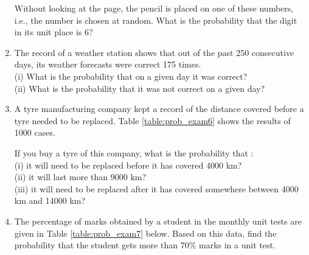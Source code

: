 \begin{enumerate}[label=\arabic*.,ref=\thesubsection.\theenumi]
\begin{table}[!ht]
\centering
{}
\caption{}
\label{table:prob_exam4}
\end{table}
Without looking at the page, the pencil is placed on one of these numbers, i.e., the number is chosen at random. What is the probability that the digit in its unit place is 6?\\
\solution

   \item The record of a weather station shows that out of the past 250 consecutive days, its weather forecasts were correct 175 times.\\
   (i) What is the probability that on a given day it was correct?\\
(ii) What is the probability that it was not correct on a given day?\\
\solution

\item A tyre manufacturing company kept a record of the distance covered
before a tyre needed to be replaced. Table \ref{table:prob_exam6}
shows the results of 1000 cases.
\begin{table}[!ht]
\centering
{}
\caption{}
\label{table:prob_exam6}
\end{table}
If you buy a tyre of this company, what is the probability that :\\
(i) it will need to be replaced before it has covered 4000 km?\\
(ii) it will last more than 9000 km?\\
(iii) it will need to be replaced after it has covered somewhere between 4000 km and 14000 km?\\
\solution

\item The percentage of marks obtained by a student in the monthly unit tests are given in Table \ref{table:prob_exam7}
below.
Based on this data, find the probability that the student gets more than 70$\%$ marks in a unit test.\\


\end{enumerate}
